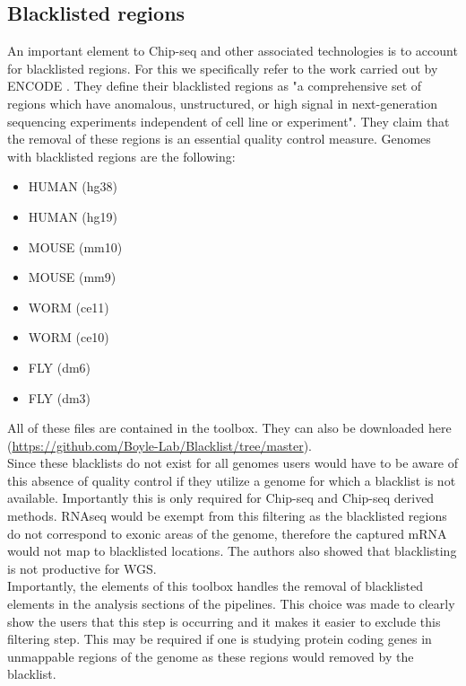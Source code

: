 \subsection{Blacklisted regions \label{subsec:blacklisted_regions}}
An important element to Chip-seq and other associated technologies is to account for blacklisted regions. For this we specifically refer to the work carried out by ENCODE \cite{amemiya2019encode}. They define their blacklisted regions as "a comprehensive set of regions which have anomalous, unstructured, or high signal in next-generation sequencing experiments independent of cell line or experiment". They claim that the removal of these regions is an essential quality control measure. Genomes with blacklisted regions are the following:\\
\begin{itemize}
\item HUMAN (hg38)
\item HUMAN (hg19)
\item MOUSE (mm10)
\item MOUSE (mm9)
\item WORM (ce11)
\item WORM (ce10)
\item FLY (dm6)
\item FLY (dm3)
\end{itemize}
All of these files are contained in the toolbox. They can also be downloaded here (\url{https://github.com/Boyle-Lab/Blacklist/tree/master}).\\
Since these blacklists do not exist for all genomes users would have to be aware of this absence of quality control if they utilize a genome for which a blacklist is not available. Importantly this is only required for Chip-seq and Chip-seq derived methods. RNAseq would be exempt from this filtering as the blacklisted regions do not correspond to exonic areas of the genome, therefore the captured mRNA would not map to blacklisted locations. The authors also showed that blacklisting is not productive for WGS.\\
Importantly, the elements of this toolbox handles the removal of blacklisted elements in the analysis sections of the pipelines. This choice was made to clearly show the users that this step is occurring and it makes it easier to exclude this filtering step. This may be required if one is studying protein coding genes in unmappable regions of the genome as these regions would removed by the blacklist.

